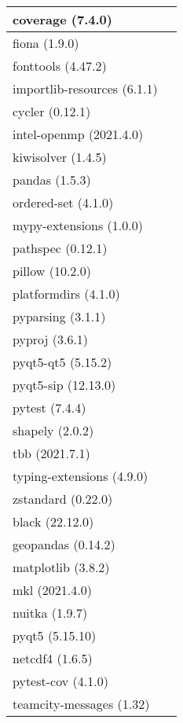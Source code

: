\begin{longtable}{|l|l|}
	coverage (7.4.0)              &                 \\ \hline
	fiona (1.9.0)                 &                 \\ \hline
	fonttools (4.47.2)            &                 \\ \hline
	importlib-resources (6.1.1)   &                 \\ \hline
	cycler (0.12.1)               &                 \\ \hline
	intel-openmp (2021.4.0)       &                 \\ \hline
	kiwisolver (1.4.5)            &                 \\ \hline
	pandas (1.5.3)                &                 \\ \hline
	ordered-set (4.1.0)           &                 \\ \hline
	mypy-extensions (1.0.0)       &                 \\ \hline
	pathspec (0.12.1)             &                 \\ \hline
	pillow (10.2.0)               &                 \\ \hline
	platformdirs (4.1.0)          &                 \\ \hline
	pyparsing (3.1.1)             &                 \\ \hline
	pyproj (3.6.1)                &                 \\ \hline
	pyqt5-qt5 (5.15.2)            &                 \\ \hline
	pyqt5-sip (12.13.0)           &                 \\ \hline
	pytest (7.4.4)                &                 \\ \hline
	shapely (2.0.2)               &                 \\ \hline
	tbb (2021.7.1)                &                 \\ \hline
	typing-extensions (4.9.0)     &                 \\ \hline
	zstandard (0.22.0)            &                 \\ \hline
	black (22.12.0)               &                 \\ \hline
	geopandas (0.14.2)            &                 \\ \hline
	matplotlib (3.8.2)            &                 \\ \hline
	mkl (2021.4.0)                &                 \\ \hline
	nuitka (1.9.7)                &                 \\ \hline
	pyqt5 (5.15.10)               &                 \\ \hline
	netcdf4 (1.6.5)               &                 \\ \hline
	pytest-cov (4.1.0)            &                 \\ \hline
	teamcity-messages (1.32)      &                 \\ \hline
\end{longtable}

